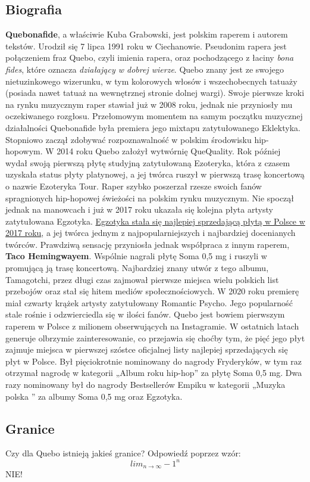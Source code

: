 \subsection{Biografia}
\textbf{Quebonafide}, a właściwie Kuba Grabowski, jest polskim raperem i autorem tekstów. Urodził się 7 lipca 1991 roku w Ciechanowie. Pseudonim rapera jest połączeniem fraz Quebo, czyli imienia rapera, oraz pochodzącego z łaciny \emph{bona fides}, które oznacza \emph{działający w dobrej wierze}. Quebo znany jest ze swojego nietuzinkowego wizerunku, w tym kolorowych włosów i wszechobecnych tatuaży (posiada nawet tatuaż na wewnętrznej stronie dolnej wargi). Swoje pierwsze kroki na rynku muzycznym raper stawiał już w 2008 roku, jednak nie przyniosły mu oczekiwanego rozgłosu. Przełomowym momentem na samym początku muzycznej działalności Quebonafide była premiera jego mixtapu zatytułowanego Eklektyka. Stopniowo zaczął zdobywać rozpoznawalność w polskim środowisku hip-hopowym. W 2014 roku Quebo założył wytwórnię QueQuality. Rok później wydał swoją pierwszą płytę studyjną zatytułowaną Ezoteryka, która z czasem uzyskała status płyty platynowej, a jej twórca ruszył w pierwszą trasę koncertową o nazwie Ezoteryka Tour. Raper szybko poszerzał rzesze swoich fanów spragnionych hip-hopowej świeżości na polskim rynku muzycznym. Nie spoczął jednak na manowcach i już w 2017 roku ukazała się kolejna płyta artysty zatytułowana Egzotyka. \underline{Egzotyka stała się najlepiej sprzedającą płytą w Polsce w 2017 roku}, a jej twórca jednym z najpopularniejszych i najbardziej docenianych twórców. Prawdziwą sensację przyniosła jednak współpraca z innym raperem, \textbf{Taco Hemingwayem}. Wspólnie nagrali płytę Soma 0,5 mg i ruszyli w promującą ją trasę koncertową. Najbardziej znany utwór z tego albumu, Tamagotchi, przez długi czas zajmował pierwsze miejsca wielu polskich list przebojów oraz stał się hitem mediów społecznościowych. W 2020 roku premierę miał czwarty krążek artysty zatytułowany Romantic Psycho. Jego popularność stale rośnie i odzwierciedla się w ilości fanów. Quebo jest bowiem pierwszym raperem w Polsce z milionem obserwujących na Instagramie. W ostatnich latach generuje olbrzymie zainteresowanie, co przejawia się choćby tym, że pięć jego płyt zajmuje miejsca w pierwszej szóstce oficjalnej listy najlepiej sprzedających się płyt w Polsce. Był pięciokrotnie nominowany do nagrody Fryderyków, w tym raz otrzymał nagrodę w kategorii „Album roku hip-hop” za płytę Soma 0,5 mg. Dwa razy nominowany był do nagrody Bestsellerów Empiku w kategorii „Muzyka polska ” za albumy Soma 0,5 mg oraz Egzotyka.
\subsection{Granice}
Czy dla Quebo istnieją jakieś granice? Odpowiedź poprzez wzór: 
\[lim_{n\to\infty}-1^n\]
NIE!
